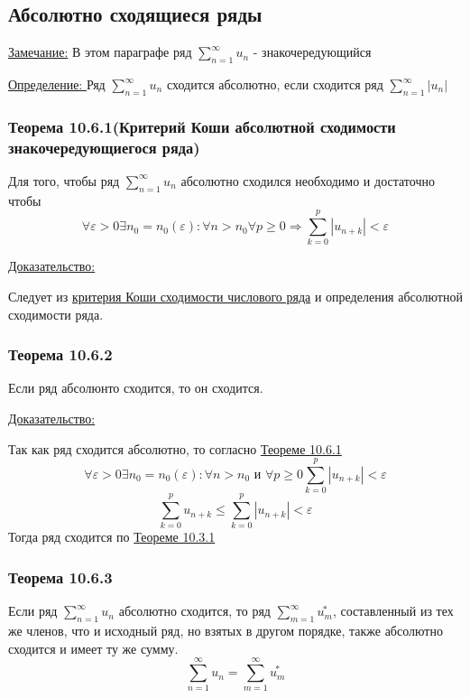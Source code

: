 \documentclass[12pt]{article}
\let\oldsum\sum
\renewcommand{\sum}{\oldsum\limits}
\begin{document}
  \subsection{Абсолютно сходящиеся ряды}
  \underline{Замечание:} В этом параграфе ряд $\sum_{n=1}^{\infty} u_n$ - знакочередующийся

  \underline{Определение: } Ряд $\sum_{n=1}^{\infty} u_n$ сходится абсолютно, если сходится ряд $\sum_{n=1}^{\infty} |u_n|$

  \subsubsection*{Теорема 10.6.1(Критерий Коши абсолютной сходимости знакочередующиегося ряда)}\label{th:10.6.1}
  \par\noindent
  Для того, чтобы ряд $\sum_{n=1}^{\infty} u_n$ абсолютно сходился необходимо и достаточно чтобы 
  \[ \forall \varepsilon > 0 \exists n_0 = n_0(\varepsilon): \forall n > n_0 \forall p \geq 0 \Rightarrow \sum_{k=0}^{p} |u_{n+k}| < \varepsilon\]

  \underline{Доказательство:}
  \begin{adjustwidth}{1.5em}{1.5em}
    Следует из \hyperref[th:10.3.1]{критерия Коши сходимости числового ряда} и определения абсолютной 
    сходимости ряда.
  \end{adjustwidth}
  
  \subsubsection*{Теорема 10.6.2}\label{th:10.6.2}
  \par\noindent
  Если ряд абсолюнто сходится, то он сходится.

  \underline{Доказательство:}
  \begin{adjustwidth}{1.5em}{1.5em}
    Так как ряд сходится абсолютно, то согласно \hyperref[th:10.6.1]{Теореме 10.6.1}
    \[\forall \varepsilon > 0 \exists n_0 = n_0(\varepsilon): \forall n>n_0 \text{ и } \forall p \geq 0
    \sum_{k=0}^{p} |u_{n+k}| < \varepsilon\]
    \[\sum_{k=0}^{p} u_{n+k} \leq \sum_{k=0}^{p} |u_{n+k}| < \varepsilon\]
    Тогда ряд сходится по \hyperref[th:10.3.1]{Теореме 10.3.1}
  \end{adjustwidth}

  \subsubsection*{Теорема 10.6.3}\label{th:10.6.3}
  \par\noindent
  Если ряд $\sum_{n=1}^{\infty} u_n$ абсолютно сходится, то ряд $\sum_{m=1}^{\infty} \overset{*}{u_m}$,
  составленный из тех же членов, что и исходный ряд, но взятых в другом порядке, также абсолютно сходится и 
  имеет ту же сумму.
  \[\sum_{n=1}^{\infty} u_n = \sum_{m=1}^{\infty} \overset{*}{u_m}\]
\end{document}
